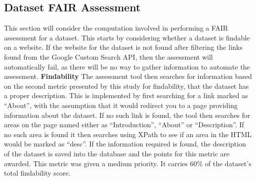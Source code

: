 \documentclass{cisfyp}
\begin{document}
\subsection{Dataset FAIR Assessment}
This section will consider the computation involved in performing a FAIR assessment for a dataset. This starts by considering whether a dataset is findable on a website. If the website for the dataset is not found after filtering the links found from the Google Custom Search API, then the assessment will automatically fail, as there will be no way to gather information to automate the assessment.\newline
\textbf{Findability}\newline
The assessment tool then searches for information based on the second metric presented by this study for findability, that the dataset has a proper description. This is implemented by first searching for a link marked as ``About'', with the assumption that it would redirect you to a page providing information about the dataset. If no such link is found, the tool then searches for areas on the page named either as ``Introduction'', ``About'' or ``Description''. If no such area is found it then searches using XPath to see if an area in the HTML would be marked as ``desc''. If the information required is found, the description of the dataset is saved into the database and the points for this metric are awarded. This metric was given a medium priority. It carries 60\% of the dataset's total findability score.
\end{document}

